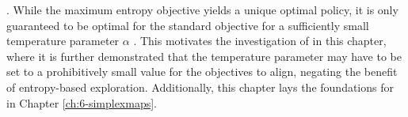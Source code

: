 

    . While the maximum entropy objective  yields a unique optimal policy, it is only guaranteed to be optimal for the standard objective  for a sufficiently small temperature parameter $\alpha$ \cite{deep_energy_policies,dents}. This motivates the investigation of \entropyq\ewe in this chapter, where it is further demonstrated that the temperature parameter may have to be set to a prohibitively small value for the objectives to align, negating the benefit of entropy-based exploration. Additionally, this chapter lays the foundations for \contextq\ewe in Chapter \ref{ch:6-simplexmaps}. %
    


